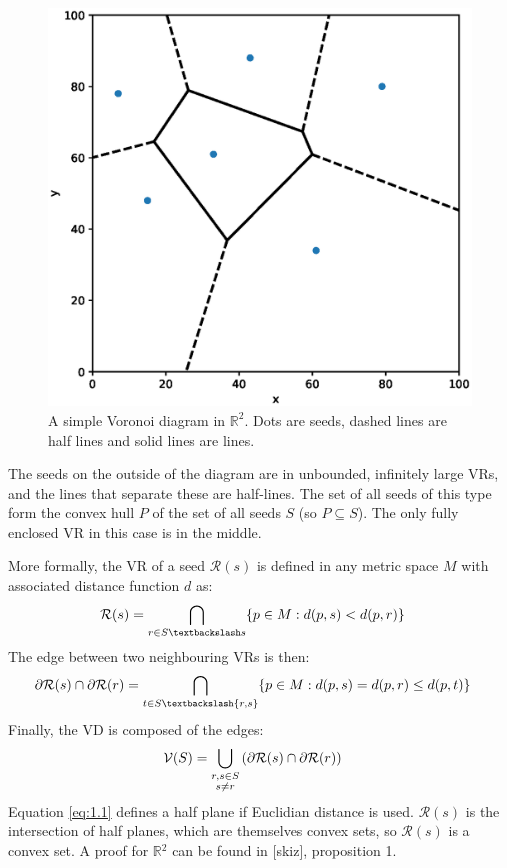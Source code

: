 \documentclass[12pt, report, a4paper, titlepage]{article}
\numberwithin{equation}{section}
\newcommand*{\citen}{}%
\DeclareRobustCommand*{\citen}[1]{%
  \begingroup
    \romannumeral-`\x %
    \setcitestyle{numbers}%
    \cite{#1}%
  \endgroup
}
\begin{document}
\begin{figure}[h!]
	\center
 	\includegraphics[width=.9\linewidth]{voronoi-simple.eps}
    \caption{A simple Voronoi diagram in $\mathbb{R}^2$. Dots are seeds, dashed lines are half lines and solid lines are lines.}
    \label{simple-vd}
\end{figure}

The seeds on the outside of the diagram are in unbounded, infinitely large VRs, and the lines that separate these are half-lines. The set of all seeds of this type form the convex hull $P$ of the set of all seeds $S$ (so $P \subseteq S$). The only fully enclosed VR in this case is in the middle.

More formally, the VR of a seed $\mathcal{R}(s)$ is defined in any metric space $M$ with associated distance function $d$ as:
\begin{align} \label{eq:1.1}
	\mathcal{R}(s) &= \underset{r \in S\textbackslash s}{\bigcap} \{ p \in M : d(p, s) < d(p, r) \} 
\end{align}
The edge between two neighbouring VRs is then:
\begin{align}
	\partial\mathcal{R}(s) \cap \partial\mathcal{R}(r) &= \underset{t \in S\textbackslash\{ r, s \}}{\bigcap} \{ p \in M : d(p, s) = d(p, r) \leq d(p, t) \} 
\end{align}
Finally, the VD is composed of the edges:
\begin{align}
	\mathcal{V}(S) &= \underset{\begin{subarray}{c}
  r, s \in S \\
  s \neq r
  \end{subarray}}{\bigcup} \left ( \partial\mathcal{R}(s) \cap \partial\mathcal{R}(r) \right )
\end{align}
Equation \ref{eq:1.1} defines a half plane if Euclidian distance is used. $\mathcal{R}(s)$ is the intersection of half planes, which are themselves convex sets, so $\mathcal{R}(s)$ is a convex set. A proof for $\mathbb{R}{^2}$ can be found in [\citen{skiz}], proposition 1.
\end{document}
